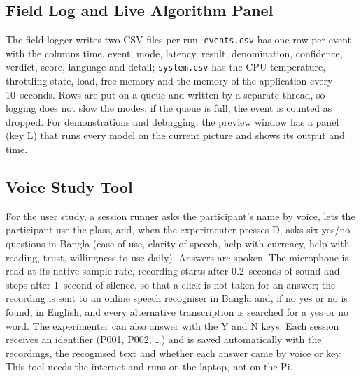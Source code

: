 \subsection*{Field Log and Live Algorithm Panel}
The field logger writes two CSV files per run. \texttt{events.csv} has one row per event with the columns time, event, mode, latency, result, denomination, confidence, verdict, score, language and detail; \texttt{system.csv} has the CPU temperature, throttling state, load, free memory and the memory of the application every 10~seconds. Rows are put on a queue and written by a separate thread, so logging does not slow the modes; if the queue is full, the event is counted as dropped. For demonstrations and debugging, the preview window has a panel (key L) that runs every model on the current picture and shows its output and time.

\subsection*{Voice Study Tool}
\label{sec:impl_voice_study}
For the user study, a session runner asks the participant's name by voice, lets the participant use the glass, and, when the experimenter presses D, asks six yes/no questions in Bangla (ease of use, clarity of speech, help with currency, help with reading, trust, willingness to use daily). Answers are spoken. The microphone is read at its native sample rate, recording starts after 0.2~seconds of sound and stops after 1~second of silence, so that a click is not taken for an answer; the recording is sent to an online speech recogniser in Bangla and, if no yes or no is found, in English, and every alternative transcription is searched for a yes or no word. The experimenter can also answer with the Y and N keys. Each session receives an identifier (P001, P002, \dots) and is saved automatically with the recordings, the recognised text and whether each answer came by voice or key. This tool needs the internet and runs on the laptop, not on the Pi.

